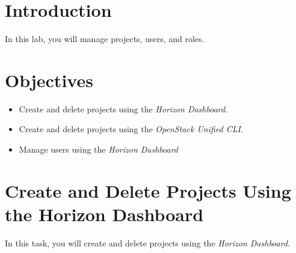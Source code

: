 \documentclass[letterpaper, 12pt]{article}
\begin{document}

\section*{Introduction}
\label{sec:introduction}
In this lab, you will manage projects, users, and roles.

\section*{Objectives}
\label{sec:objectives}
\begin{itemize}[itemsep=0pt]
    \item Create and delete projects using the \textit{Horizon Dashboard}.
    \item Create and delete projects using the \textit{OpenStack Unified CLI}.
    \item Manage users using the \textit{Horizon Dashboard}
\end{itemize}
\clearpage

\labsettings

\section{Create and Delete Projects Using the Horizon Dashboard}
\label{sec:create_and_delete_projects_using_the_horizon_dashboard}
In this task, you will create and delete projects using the \textit{Horizon Dashboard}.
\end{document}
